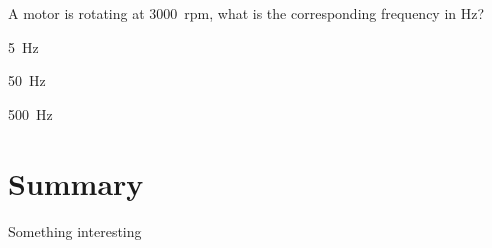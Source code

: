 \begin{checkpointMC}{A motor is rotating at \SI{3000}{rpm}, what is the corresponding frequency in \si{Hz}?}
\item \SI{5}{Hz}
\item \SI{50}{Hz}%
\item \SI{500}{Hz}
\end{checkpointMC}


\newpage
\section{Summary}
\vspace{2cm}
\begin{chapterSummary}
\item Something interesting
\end{chapterSummary}